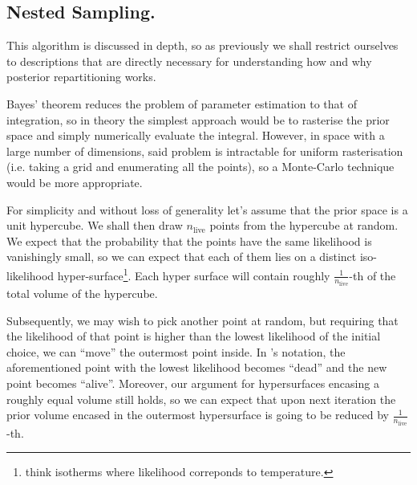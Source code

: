 \documentclass[usenatbib]{mnras}
\begin{document}
\subsection{Nested Sampling.}
\label{sec:org842f468}

This algorithm is discussed in depth, so as previously we shall
restrict ourselves to descriptions that are directly necessary for
understanding how and why posterior repartitioning works.

Bayes' theorem reduces the problem of parameter estimation to that
of integration, so in theory the simplest approach would be to
rasterise the prior space and simply numerically evaluate the
integral. However, in space with a large number of dimensions, said
problem is intractable for uniform rasterisation (i.e. taking a
grid and enumerating all the points), so a Monte-Carlo technique
would be more appropriate.

For simplicity and without loss of generality let's assume that the
prior space is a unit hypercube.  We shall then draw
\(n_\text{live}\) points from the hypercube at random. We expect
that the probability that the points have the same likelihood is
vanishingly small, so we can expect that each of them lies on a
distinct iso-likelihood hyper-surface\footnote{think isotherms  where likelihood correponds to temperature.}. Each hyper surface
will contain roughly \(\frac{1}{n_\text{live}}\)-th of the total
volume of the hypercube.

Subsequently, we may wish to pick another point at random, but
requiring that the likelihood of that point is higher than the
lowest likelihood of the initial choice, we can ``move'' the
outermost point inside. In \citeauthor{skilling2006}'s notation, the
aforementioned point with the lowest likelihood becomes ``dead''
and the new point becomes ``alive''. Moreover, our argument for
hypersurfaces encasing a roughly equal volume still holds, so we
can expect that upon next iteration the prior volume encased in the
outermost hypersurface is going to be reduced by \(\frac{1}{n_\text{live}}\)-th. 
\end{document}
